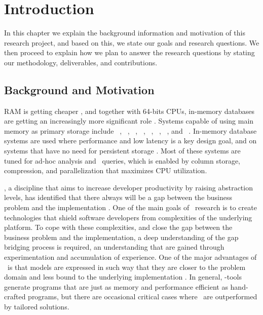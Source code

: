 \chapter{Introduction}
\label{chap:introduction}
In this chapter we explain the background information and motivation of this research project, and based on this, we state our goals and research questions. We then proceed to explain how we plan to answer the research questions by stating our methodology, deliverables, and contributions.
\clearpage

\section{Background and Motivation}
\label{sec:Background and Motivation}
RAM is getting cheaper \cite{Exasol2014-xh}, and together with 64-bits CPUs, in-memory databases are getting an increasingly more significant role \cite{Delaney2014-ip}. Systems capable of using main memory as primary storage include \oracle~\cite{Lahiri2015-mz}, \saph~\cite{Farber2012-vh}, \gorilla~\cite{Pelkonen2015-ko}, \qlikview~\cite{Qlik2011-ef}, \tableau~\cite{Kamkolkar2015-iq}, \monetdb~\cite{Boncz2002-yj}, \blink~\cite{Barber2012-xt}, and \sapnw~\cite{Lemke2010-is}. In-memory database systems are used where performance and low latency is a key design goal, and on systems that have no need for persistent storage \cite{Zicari2012-is}. Most of these systems are tuned for ad-hoc analysis and \bi~queries, which is enabled by column storage, compression, and parallelization that maximizes CPU utilization.

\mde, a discipline that aims to increase developer productivity by raising abstraction levels, has identified that there always will be a gap between the business problem and the implementation \cite{France2007-ae}. One of the main goals of \mdd~research is to create technologies that shield software developers from complexities of the underlying platform. To cope with these complexities, and close the gap between the business problem and the implementation, a deep understanding of the gap bridging process is required, an understanding that are gained through experimentation and accumulation of experience. One of the major advantages of \mde~is that models are expressed in such way that they are closer to the problem domain and less bound to the underlying implementation \cite{Selic2003-qa}. In general, \mdd-tools generate programs that are just as memory and performance efficient as hand-crafted programs, but there are occasional critical cases where \mde~are outperformed by tailored solutions.


